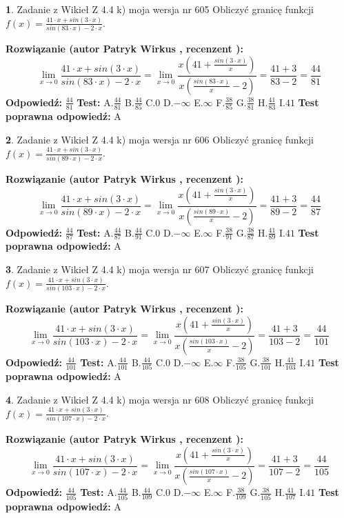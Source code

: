 \documentclass[12pt, a4paper]{article}
\theoremstyle{definition} %
\newtheorem{zad}{}
\newcommand{\zadStart}[1]{\begin{zad}#1\newline}
\newcommand{\zadStop}{\end{zad}}
\newcommand{\rozwStart}[2]{\noindent \textbf{Rozwiązanie (autor #1 , recenzent #2): }\newline}
\newcommand{\rozwStop}{\newline}
\newcommand{\odpStart}{\noindent \textbf{Odpowiedź:}\newline}
\newcommand{\odpStop}{\newline}
\newcommand{\testStart}{\noindent \textbf{Test:}\newline}
\newcommand{\testStop}{\newline}
\newcommand{\kluczStart}{\noindent \textbf{Test poprawna odpowiedź:}\newline}
\newcommand{\kluczStop}{\newline}
\begin{document}
\zadStart{Zadanie z Wikieł Z 4.4 k) moja wersja nr 605}
Obliczyć granicę funkcji $f(x)=\frac{41\cdot x +sin(3\cdot x)}{sin(83\cdot x) -2\cdot x}$.
\zadStop
\rozwStart{Patryk Wirkus}{}
$$\lim\limits_{x\to 0}\frac{41\cdot x +sin(3\cdot x)}{sin(83\cdot x) -2\cdot x}
=\lim\limits_{x\to 0}\frac{x(41+\frac{sin(3\cdot x)}{x})}{x(\frac{sin(83\cdot x)}{x}-2)}
=\frac{41+3}{83-2} = \frac{44}{81}$$
\rozwStop
\odpStart
$\frac{44}{81}$
\odpStop
\testStart
A.$\frac{44}{81}$
B.$\frac{44}{85}$
C.$0$
D.$-\infty$
E.$\infty$
F.$\frac{38}{85}$
G.$\frac{38}{81}$
H.$\frac{41}{83}$
I.$41$
\testStop
\kluczStart
A
\kluczStop



\zadStart{Zadanie z Wikieł Z 4.4 k) moja wersja nr 606}
Obliczyć granicę funkcji $f(x)=\frac{41\cdot x +sin(3\cdot x)}{sin(89\cdot x) -2\cdot x}$.
\zadStop
\rozwStart{Patryk Wirkus}{}
$$\lim\limits_{x\to 0}\frac{41\cdot x +sin(3\cdot x)}{sin(89\cdot x) -2\cdot x}
=\lim\limits_{x\to 0}\frac{x(41+\frac{sin(3\cdot x)}{x})}{x(\frac{sin(89\cdot x)}{x}-2)}
=\frac{41+3}{89-2} = \frac{44}{87}$$
\rozwStop
\odpStart
$\frac{44}{87}$
\odpStop
\testStart
A.$\frac{44}{87}$
B.$\frac{44}{91}$
C.$0$
D.$-\infty$
E.$\infty$
F.$\frac{38}{91}$
G.$\frac{38}{87}$
H.$\frac{41}{89}$
I.$41$
\testStop
\kluczStart
A
\kluczStop



\zadStart{Zadanie z Wikieł Z 4.4 k) moja wersja nr 607}
Obliczyć granicę funkcji $f(x)=\frac{41\cdot x +sin(3\cdot x)}{sin(103\cdot x) -2\cdot x}$.
\zadStop
\rozwStart{Patryk Wirkus}{}
$$\lim\limits_{x\to 0}\frac{41\cdot x +sin(3\cdot x)}{sin(103\cdot x) -2\cdot x}
=\lim\limits_{x\to 0}\frac{x(41+\frac{sin(3\cdot x)}{x})}{x(\frac{sin(103\cdot x)}{x}-2)}
=\frac{41+3}{103-2} = \frac{44}{101}$$
\rozwStop
\odpStart
$\frac{44}{101}$
\odpStop
\testStart
A.$\frac{44}{101}$
B.$\frac{44}{105}$
C.$0$
D.$-\infty$
E.$\infty$
F.$\frac{38}{105}$
G.$\frac{38}{101}$
H.$\frac{41}{103}$
I.$41$
\testStop
\kluczStart
A
\kluczStop



\zadStart{Zadanie z Wikieł Z 4.4 k) moja wersja nr 608}
Obliczyć granicę funkcji $f(x)=\frac{41\cdot x +sin(3\cdot x)}{sin(107\cdot x) -2\cdot x}$.
\zadStop
\rozwStart{Patryk Wirkus}{}
$$\lim\limits_{x\to 0}\frac{41\cdot x +sin(3\cdot x)}{sin(107\cdot x) -2\cdot x}
=\lim\limits_{x\to 0}\frac{x(41+\frac{sin(3\cdot x)}{x})}{x(\frac{sin(107\cdot x)}{x}-2)}
=\frac{41+3}{107-2} = \frac{44}{105}$$
\rozwStop
\odpStart
$\frac{44}{105}$
\odpStop
\testStart
A.$\frac{44}{105}$
B.$\frac{44}{109}$
C.$0$
D.$-\infty$
E.$\infty$
F.$\frac{38}{109}$
G.$\frac{38}{105}$
H.$\frac{41}{107}$
I.$41$
\testStop
\kluczStart
A
\kluczStop
\end{document}
